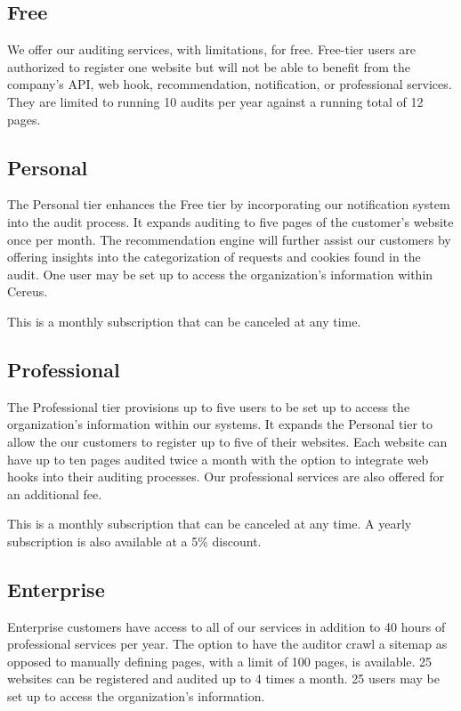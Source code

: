 \subsection{Free}

We offer our auditing services, with limitations, for free. Free-tier users are authorized to register one website but will not be able to benefit from the company's API, web hook, recommendation, notification, or professional services. They are limited to running 10 audits per year against a running total of 12 pages.

\subsection{Personal}

The Personal tier enhances the Free tier by incorporating our notification system into the audit process. It expands auditing to five pages of the customer's website once per month. The recommendation engine will further assist our customers by offering insights into the categorization of requests and cookies found in the audit. One user may be set up to access the organization's information within Cereus.

This is a monthly subscription that can be canceled at any time.

\subsection{Professional}

The Professional tier provisions up to five users to be set up to access the organization's information within our systems. It expands the Personal tier to allow the our customers to register up to five of their websites. Each website can have up to ten pages audited twice a month with the option to integrate web hooks into their auditing processes. Our professional services are also offered for an additional fee.

This is a monthly subscription that can be canceled at any time. A yearly subscription is also available at a 5\% discount.

\subsection{Enterprise}

Enterprise customers have access to all of our services in addition to 40 hours of professional services per year. The option to have the auditor crawl a sitemap as opposed to manually defining pages, with a limit of 100 pages, is available. 25 websites can be registered and audited up to 4 times a month. 25 users may be set up to access the organization's information.

